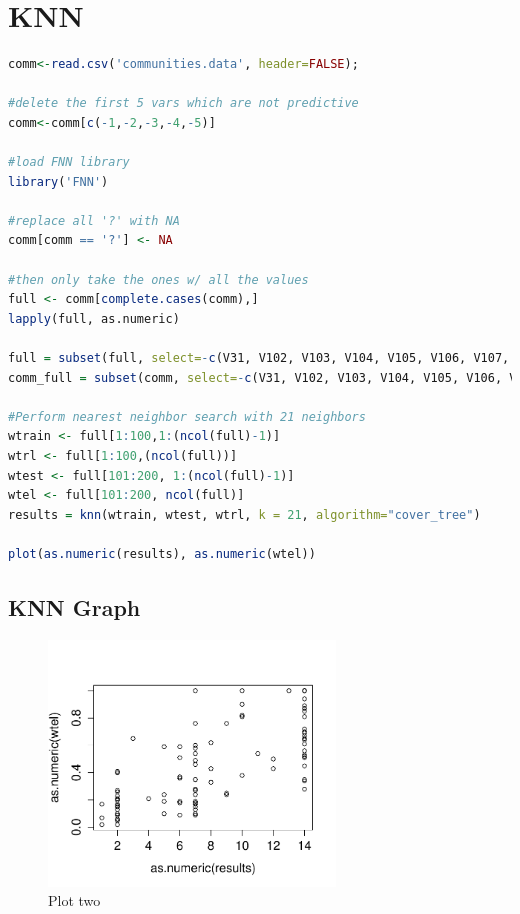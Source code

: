 \documentclass{article}
\begin{document}
\section{KNN}
\begin{lstlisting}[language=r]
comm<-read.csv('communities.data', header=FALSE);

#delete the first 5 vars which are not predictive
comm<-comm[c(-1,-2,-3,-4,-5)] 

#load FNN library
library('FNN')

#replace all '?' with NA
comm[comm == '?'] <- NA

#then only take the ones w/ all the values
full <- comm[complete.cases(comm),]
lapply(full, as.numeric)

full = subset(full, select=-c(V31, V102, V103, V104, V105, V106, V107, V108, V109, V111, V110, V112, V113, V114, V115, V116, V117, V118, V122, V123, V124, V125, V127))
comm_full = subset(comm, select=-c(V31, V102, V103, V104, V105, V106, V107, V108, V109, V111, V110, V112, V113, V114, V115, V116, V117, V118, V122, V123, V124, V125, V127))

#Perform nearest neighbor search with 21 neighbors
wtrain <- full[1:100,1:(ncol(full)-1)]
wtrl <- full[1:100,(ncol(full))]
wtest <- full[101:200, 1:(ncol(full)-1)]
wtel <- full[101:200, ncol(full)]
results = knn(wtrain, wtest, wtrl, k = 21, algorithm="cover_tree")

plot(as.numeric(results), as.numeric(wtel))
\end{lstlisting}

\subsection{KNN Graph}
\begin{figure}[H]
\centering
\includegraphics[width=3.0in]{knn.pdf}
\caption{Plot two}\label{fig_container} 
\end{figure}
\end{document}
